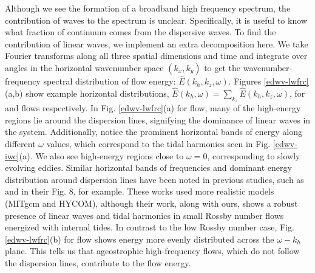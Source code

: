 \documentclass[../Rajarshi-thesis-draft.tex]{subfiles}
\begin{document}
	
    Although we see the formation of a broadband high frequency spectrum, the contribution of waves to the spectrum is unclear. %
    Specifically, it is useful to know what fraction of continuum comes from the dispersive waves. To find the contribution  of linear waves, we implement an extra decomposition here. We take Fourier transforms along all three spatial dimensions and time and integrate over angles in the horizontal wavenumber space $(k_x, k_y)$ to get the wavenumber-frequency spectral distribution of flow energy: $\hat{E}(k_h,k_z,\omega)$. Figures \ref{edwv-lwfrc}(a,b) show example horizontal distributions, $\hat{E}\left( k_h,\omega \right) = \sum_{k_z}\hat{E}(k_h,k_z,\omega)$, for \lre and \hre flows respectively. In Fig. \ref{edwv-lwfrc}(a) for \lre flow, many of the high-energy regions lie around the dispersion lines, signifying the dominance of linear waves in the system. Additionally, notice the prominent horizontal bands of energy along different $\omega$ values, which correspond to the tidal harmonics seen in Fig. \ref{edwv-iwc}(a). We also see high-energy regions close to $\omega=0$, corresponding to slowly evolving eddies. Similar horizontal bands of frequencies and dominant energy distribution around dispersion lines have been noted in previous studies, such as \citet{Ansong_etal_2024} and \citet{buijsman2025} in their Fig. 8, for example. These works used more realistic models (MITgcm and HYCOM), although their work, along with ours, shows a robust presence of linear waves and tidal harmonics in small Rossby number flows energized with internal tides. In contrast to the low Rossby number case, Fig. \ref{edwv-lwfrc}(b) for \hre flow shows energy more evenly distributed across the $\omega-k_h$ plane. This tells us that ageostrophic high-frequency flows, which do not follow the dispersion lines, contribute  to the flow  energy. 
    
\end{document}
